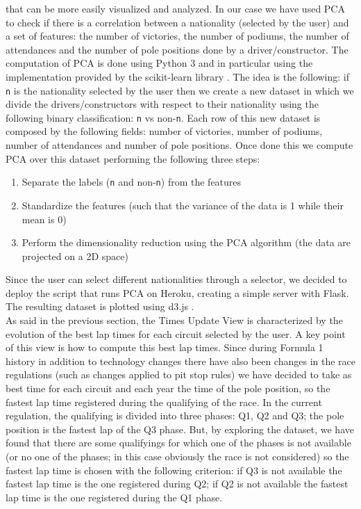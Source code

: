 \documentclass[11pt,twocolumn,letterpaper]{article}
\begin{document}
that can be more easily visualized and analyzed. In our case we have used PCA to check if there is a correlation between a nationality (selected by the user) and a set of features:
the number of victories, the number of podiums, the number of attendances and the number of pole positions done by a driver/constructor. The computation of PCA is done using Python 3 
and in particular using the implementation provided by the scikit-learn library \cite{Scikit-learn}. The idea is the following: if \texttt{n} is the nationality selected by the user 
then we create a new dataset in which we divide the drivers/constructors with respect to their nationality using the following binary classification: \texttt{n} vs non-\texttt{n}. 
Each row of this new dataset is composed by the following fields: number of victories, number of podiums, number of attendances and number of pole positions. Once done this we compute
PCA over this dataset performing the following three steps:
\begin{enumerate}
	\item Separate the labels (\texttt{n} and non-\texttt{n}) from the features
	\item Standardize the features (such that the variance of the data is 1 while their mean is 0)
	\item Perform the dimensionality reduction using the PCA algorithm (the data are projected on a 2D space)
\end{enumerate}
Since the user can select different nationalities through a selector, we decided to deploy the script that runs PCA on Heroku\cite{Heroku}, creating a simple server with Flask\cite{Flask}.
The resulting dataset is plotted using d3.js \cite{D3}.\\
As said in the previous section, the Times Update View is characterized by the evolution of the best lap times for each circuit selected by the user. A key point of this view is how to 
compute this best lap times. Since during Formula 1 history in addition to technology changes there have also been changes in the race regulations (such as changes applied to pit stop
rules) we have decided to take as best time for each circuit and each year the time of the pole position, so the fastest lap time registered during the qualifying of the race.
In the current regulation, the qualifying is divided into three phases: Q1, Q2 and Q3; the pole position is the fastest lap of the Q3 phase. But, by exploring the dataset, we have found
that there are some qualifyings for which one of the phases is not available (or no one of the phases; in this case obviously the race is not considered) so the fastest lap time is chosen
with the following criterion: if Q3 is not available the fastest lap time is the one registered during Q2; if Q2 is not available the fastest lap time is the one registered during
the Q1 phase.
\end{document}
